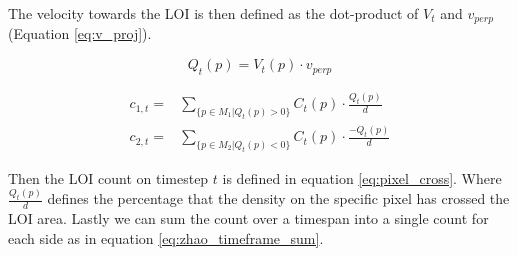 The velocity towards the LOI is then defined as the dot-product of $V_t$ and $v_{perp}$ (Equation \ref{eq:v_proj}).

\begin{equation}
	Q_t(p) = V_t(p) \cdot v_{perp}
	\label{eq:v_proj}
\end{equation}


\begin{equation}
\begin{aligned}
	c_{1,t} =& \sum_{\{p \in M_1 | Q_t(p) > 0\}} C_t(p) \cdot \frac{Q_t(p)}{d}\\
	c_{2,t} =& \sum_{\{p \in M_2 | Q_t(p) < 0\}} C_t(p) \cdot \frac{-Q_t(p)}{d}
\end{aligned}
\label{eq:pixel_cross}
\end{equation}

Then the LOI count on timestep $t$ is defined in equation \ref{eq:pixel_cross}. Where $\frac{Q_t(p)}{d}$ defines the percentage that the density on the specific pixel has crossed the LOI area. Lastly we can sum the count over a timespan into a single count for each side as in equation \ref{eq:zhao_timeframe_sum}.
